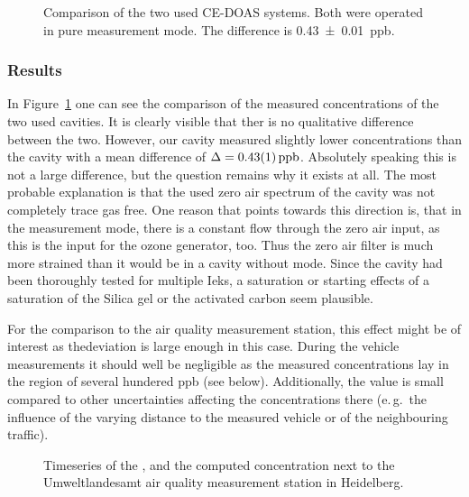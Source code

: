 \begin{figure}[htbp]
  \centering
  
  \caption{Comparison of the two used CE-DOAS systems. Both were
    operated in pure  measurement mode. The difference is
    \SI{0.43 \pm 0.01}{ppb}.}
  \label{fig:hd-comparison}
\end{figure}

\subsubsection{Results}
\label{sec:vehicle-results}

In Figure~\ref{fig:hd-comparison} one can see the comparison of the
measured  concentrations of the two used cavities. It is
clearly visible that ther is no qualitative difference between the
two. However, our  cavity measured slightly lower
concentrations than the  cavity with a mean difference of
$\Delta = \SI{0.43\pm0.01}{ppb}$. Absolutely speaking this is not a
large difference, but the question remains why it exists at all. The
most probable explanation is that the used zero air spectrum of the
 cavity was not completely trace gas free. One reason that
points towards this direction is, that in the  measurement
mode, there is a constant flow through the zero air input, as this is
the input for the ozone generator, too. Thus the zero air filter is much
more strained than it would be in a cavity without 
mode. Since the cavity had been thoroughly tested for multiple
Ieks, a saturation or starting effects of a saturation of
the Silica gel or the activated carbon seem plausible.

For the comparison to the air quality measurement station, this effect
might be of interest as thedeviation is large enough in this
case. During the vehicle measurements it should well be negligible as
the measured concentrations lay in the region of several hundered
\si{ppb} (see below). Additionally, the value is small compared to
other uncertainties affecting the concentrations there (e.\,g.\ the
influence of the varying distance to the measured vehicle or of the
neighbouring traffic).

\begin{figure}[htbp]
  \centering
  
  \caption{Timeseries of the ,  and the computed
     concentration next to the Umweltlandesamt air quality
    measurement station in Heidelberg.}
  \label{fig:umba}
\end{figure}


